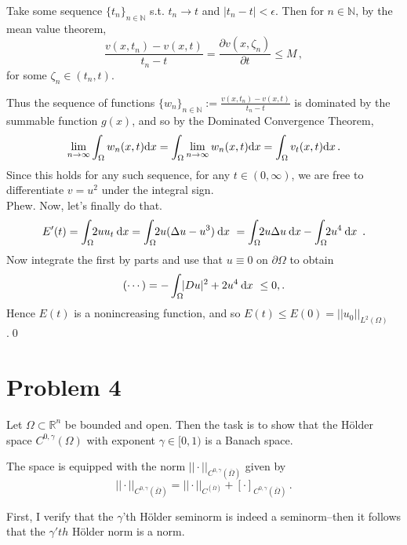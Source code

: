\documentclass[11pt]{amsart}
\theoremstyle{definition}
\newcommand{\N}{\mathbb{N}}
\newcommand{\R}{\mathbb{R}}
\numberwithin{equation}{section}
\begin{document}
Take some sequence $\{t_n\}_{n\in\N}$ s.t. $t_n \to t$ and $|t_n - t| < \epsilon$. Then for $n\in\N$, by the mean value theorem,
\begin{equation}
\frac{v(x, t_n) - v(x,t)}{t_n - t} = \frac{\partial v(x, \zeta_n)}{\partial t} \leq M\,,
\end{equation}
for some $\zeta_n \in (t_n, t)$.

Thus the sequence of functions $\{w_n\}_{n\in\N} := \frac{v(x,t_n) - v(x,t)}{t_n - t}$ is dominated by the summable function $g(x)$, and so by the Dominated Convergence Theorem,
\begin{equation}
\lim_{n\to\infty}\int_\Omega w_n(x,t)\mbox{d}x = \int_\Omega
\lim_{n\to\infty} w_n(x,t)\mbox{d}x
= \int_\Omega v_t(x,t)\mbox{d}x\,.
\end{equation}
Since this holds for any such sequence, for any $t\in(0,\infty)$, we are free to differentiate $v = u^2$ under the integral sign.
\\
Phew. Now, let's finally do that.
\begin{equation}
E'(t) = 
\int_\Omega\!\!
2u u_t
\:\dx
= 
\int_\Omega\!\!
2u(\Delta u - u^3)
\:\dx\
=
\int_\Omega\!\!
2u\Delta u 
\:\dx
-
\int_\Omega\!\!
2u^4
\:\dx\
\,.
\end{equation}
Now integrate the first by parts and use that $u \equiv 0$ on $\partial \Omega$ to obtain
\begin{equation}
(\cdots) =
-\int_\Omega\!\!
|Du|^2 + 2u^4
\:\mbox{d}x\ \leq 0,.
\end{equation}
Hence $E(t)$ is a nonincreasing function, and so $E(t) \leq E(0) = ||u_0||_{L^2(\Omega)}$.\qed

\section{Problem 4}
Let $\Omega \subset \R^n$ be bounded and open. Then the task is to show that the Hölder space $C^{0,\gamma}(\Omega)$ with exponent $\gamma \in [0,1)$ is a Banach space.
\\
\newcommand{\cnorm}[1]{||#1||_{C^(\overline{\Omega})}}
\newcommand{\hnorm}[1]{||#1||_{C^{0,\gamma}(\overline{\Omega})}}
\newcommand{\hsnorm}[1]{[#1]_{C^{0,\gamma}(\overline{\Omega})}}

The space is equipped with the norm $\hnorm{\cdot}$ given by
\begin{equation}
\hnorm{\cdot} = \cnorm{\cdot} + \hsnorm{\cdot}\,.
\end{equation}

First, I verify that the $\gamma$'th Hölder seminorm is indeed a seminorm--then it follows that the $\gamma'th$ Hölder norm is a norm.
\end{document}
